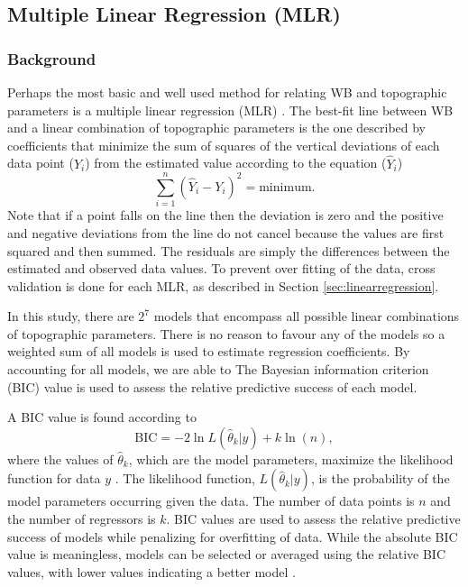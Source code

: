 \documentclass{sfuthesis}
\begin{document}
\subsection{Multiple Linear Regression (MLR)}
\label{sec:MLR}

\subsubsection{Background}

Perhaps the most basic and well used method for relating WB and topographic parameters is a multiple linear regression (MLR) \citep[e.g.][]{Cohen2013}. The best-fit line between WB and a linear combination of topographic parameters is the one described by coefficients that minimize the sum of squares of the vertical deviations of each data point ($Y_i$) from the estimated value according to the equation ($\hat{Y}_i$) \citep{Davis1986}
\begin{equation}
\sum^n_{i=1}(\hat{Y}_i-Y_i)^2 = \mathrm{minimum}.
\end{equation}
Note that if a point falls on the line then the deviation is zero and  the positive and negative deviations from the line do not cancel because the values are first squared and then summed. The residuals are simply the differences between the estimated and observed data values. To prevent over fitting of the data, cross validation is done for each MLR, as described in Section \ref{sec:linearregression}.

In this study, there are $2^7$ models that encompass all possible linear combinations of topographic parameters. There is no reason to favour any of the models so a weighted sum of all models is used to estimate regression coefficients. By accounting for all models, we are able to  The Bayesian information criterion (BIC) value is used to assess the relative predictive success of each model. 

A BIC value is found according to
\begin{equation}
\textrm{BIC} = -2 \ln L(\hat\theta_k  | y) + k \ln(n),
\end{equation}
where the values of $\hat \theta_k$, which are the model parameters, maximize the likelihood function for data $y$ \citep{Burnham2004}. The likelihood function, $ L(\hat\theta_k  | y)$, is the probability of the model parameters occurring given the data. The number of data points is $n$ and the number of regressors is $k$. BIC values are used to assess the relative predictive success of models while penalizing for overfitting of data. While the absolute BIC value is meaningless, models can be selected or averaged using the relative BIC values, with lower values indicating a better model \citep{Burnham2004}. 
\end{document}
